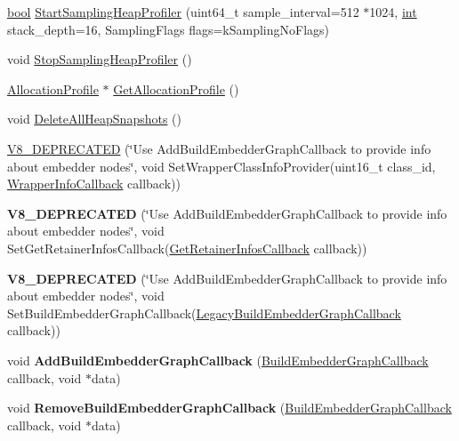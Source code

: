 \begin{DoxyCompactItemize}
\item 
\mbox{\hyperlink{classbool}{bool}} \mbox{\hyperlink{classv8_1_1HeapProfiler_a6b9450bbf1f4e1a4909df92d4df4a174}{Start\+Sampling\+Heap\+Profiler}} (uint64\+\_\+t sample\+\_\+interval=512 $\ast$1024, \mbox{\hyperlink{classint}{int}} stack\+\_\+depth=16, Sampling\+Flags flags=k\+Sampling\+No\+Flags)
\item 
void \mbox{\hyperlink{classv8_1_1HeapProfiler_abc43e12e6febb087be251c0629ff17bf}{Stop\+Sampling\+Heap\+Profiler}} ()
\item 
\mbox{\hyperlink{classv8_1_1AllocationProfile}{Allocation\+Profile}} $\ast$ \mbox{\hyperlink{classv8_1_1HeapProfiler_a371a6e936782571f81542bfafce359d9}{Get\+Allocation\+Profile}} ()
\item 
void \mbox{\hyperlink{classv8_1_1HeapProfiler_a6a75bcc6d8350858597b6a6ce5e349a2}{Delete\+All\+Heap\+Snapshots}} ()
\item 
\mbox{\hyperlink{classv8_1_1HeapProfiler_af41ccd8baea0da8d701e565b7b2e8eab}{V8\+\_\+\+D\+E\+P\+R\+E\+C\+A\+T\+ED}} (\char`\"{}Use Add\+Build\+Embedder\+Graph\+Callback to provide info about embedder nodes\char`\"{}, void Set\+Wrapper\+Class\+Info\+Provider(uint16\+\_\+t class\+\_\+id, \mbox{\hyperlink{classv8_1_1HeapProfiler_a677025dd201fd832e0464e5ab0b0d0d4}{Wrapper\+Info\+Callback}} callback))
\item 
\mbox{\label{classv8_1_1HeapProfiler_a3eec72179d8275779d119eddd999af47}} 
{\bfseries V8\+\_\+\+D\+E\+P\+R\+E\+C\+A\+T\+ED} (\char`\"{}Use Add\+Build\+Embedder\+Graph\+Callback to provide info about embedder nodes\char`\"{}, void Set\+Get\+Retainer\+Infos\+Callback(\mbox{\hyperlink{classv8_1_1HeapProfiler_a7f34c8eb67f9502e5778695187ea0e96}{Get\+Retainer\+Infos\+Callback}} callback))
\item 
\mbox{\label{classv8_1_1HeapProfiler_aad59e7bd760ee8eb06685391193e38ae}} 
{\bfseries V8\+\_\+\+D\+E\+P\+R\+E\+C\+A\+T\+ED} (\char`\"{}Use Add\+Build\+Embedder\+Graph\+Callback to provide info about embedder nodes\char`\"{}, void Set\+Build\+Embedder\+Graph\+Callback(\mbox{\hyperlink{classv8_1_1HeapProfiler_aafaa85413706329f7767f559b701eb1a}{Legacy\+Build\+Embedder\+Graph\+Callback}} callback))
\item 
\mbox{\label{classv8_1_1HeapProfiler_a4aa69e692d215f7b4599afe2c9dbfbfd}} 
void {\bfseries Add\+Build\+Embedder\+Graph\+Callback} (\mbox{\hyperlink{classv8_1_1HeapProfiler_a29c98afa5ce0ea543eef904201bc3e40}{Build\+Embedder\+Graph\+Callback}} callback, void $\ast$data)
\item 
\mbox{\label{classv8_1_1HeapProfiler_a3f7289d12816af7738944f530d28495d}} 
void {\bfseries Remove\+Build\+Embedder\+Graph\+Callback} (\mbox{\hyperlink{classv8_1_1HeapProfiler_a29c98afa5ce0ea543eef904201bc3e40}{Build\+Embedder\+Graph\+Callback}} callback, void $\ast$data)
\end{DoxyCompactItemize}
